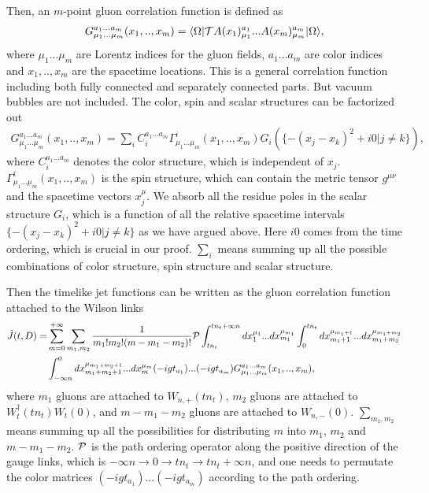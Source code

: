 \documentclass[a4paper,11pt]{article}
\begin{document}
Then, an $m$-point gluon correlation function is defined as 
\begin{align}
G_{\mu_1...\mu_m}^{a_1 ... a_m}(x_1,..,x_m) = \langle \Omega |{\cal T} A(x_1)_{\mu_1}^{a_1} ... A(x_m)_{\mu_m}^{a_m} | \Omega \rangle,
\end{align}
where $\mu_1...\mu_m$ are Lorentz indices for the gluon fields, $a_1 ... a_m$ are color indices and $x_1,..,x_m$ are the spacetime locations. This is a general correlation function including both fully connected and separately connected parts. But vacuum bubbles are not included. The color, spin and scalar structures can be factorized out
\begin{align}
G_{\mu_1...\mu_m}^{a_1 ... a_m}(x_1,..,x_m) = \sum_{i} C_{i}^{a_1 ... a_m} \Gamma^{i}_{\mu_1...\mu_m}(x_1,..,x_m) G_{i}(\{-(x_j-x_k)^2+i0|j\neq k\}),
\end{align}
where $C_{i}^{a_1 ... a_m}$ denotes the color structure, which is independent of $x_j$. $\Gamma^{i}_{\mu_1...\mu_m}(x_1,..,x_m)$ is the spin structure, which can contain the metric tensor $g^{\mu \nu}$ and the spacetime vectors $x_j^{\mu}$. We absorb all the residue poles in the scalar structure $G_{i}$, which is a function of all the relative spacetime intervals $\{-(x_j-x_k)^2+i0|j\neq k\}$ as we have argued above. Here $i0$ comes from the time ordering, which is crucial in our proof. $\sum_{i}$ means summing up all the possible combinations of color structure, spin structure and scalar structure. 

Then the timelike jet functions can be written as the gluon correlation function attached to the Wilson links
\begin{align}
\tilde J(t,D)=&\sum_{m=0}^{+\infty} \sum_{m_1,m_2} \frac{1}{m_1! m_2! (m-m_1-m_2)!} {\cal P} \int^{t n_t + \infty n}_{t n_t} d x_1^{\mu_1} ... d x_{m_1}^{\mu_{m_1}} \int^{t n_t}_{0} d x_{m_1 + 1}^{\mu_{m_1+1}} ... d x_{m_1 + m_2}^{\mu_{m_1+m_2}} \nonumber\\ 
&\int^{0}_{-\infty n} d x_{m_1 + m_2 + 1}^{\mu_{m_1+m_2+1}} ... d x_{m}^{\mu_m} (-i g t_{a_1})...(-i g t_{a_{m}}) G_{\mu_1...\mu_m}^{a_1 ... a_m}(x_1,..,x_m),
\end{align}
where $m_1$ gluons are attached to $W_{n,+}(t n_t)$, $m_2$ gluons are attached to $W_t^{\dagger}(t n_t)W_t(0)$, and $m-m_1-m_2$ gluons are attached to $W_{n,-}(0)$. $\sum_{m_1,m_2}$ means summing up all the possibilities for distributing $m$ into $m_1$, $m_2$ and $m-m_1-m_2$. ${\cal P}$ is the path ordering operator along the positive direction of the gauge links, which is $-\infty n \rightarrow 0 \rightarrow t n_t \rightarrow t n_t + \infty n$, and one needs to permutate the color matrices $(-i g t_{a_1})...(-i g t_{a_{m}})$ according to the path ordering. 
\end{document}
